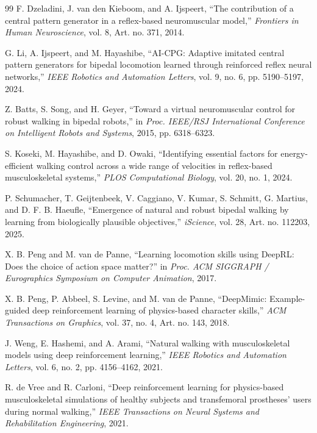 \documentclass[acmtog,screen]{acmart}
\begin{document}
\begin{thebibliography}{99}
F. Dzeladini, J. van den Kieboom, and A. Ijspeert, ``The contribution of a
central pattern generator in a reflex-based neuromuscular model,''
\textit{Frontiers in Human Neuroscience}, vol. 8, Art. no. 371, 2014.

G. Li, A. Ijspeert, and M. Hayashibe, ``AI-CPG: Adaptive imitated central
pattern generators for bipedal locomotion learned through reinforced reflex
neural networks,'' \textit{IEEE Robotics and Automation Letters}, vol. 9,
no. 6, pp. 5190--5197, 2024.

Z. Batts, S. Song, and H. Geyer, ``Toward a virtual neuromuscular control for
robust walking in bipedal robots,'' in \textit{Proc. IEEE/RSJ International
Conference on Intelligent Robots and Systems}, 2015, pp. 6318--6323.

S. Koseki, M. Hayashibe, and D. Owaki, ``Identifying essential factors for
energy-efficient walking control across a wide range of velocities in
reflex-based musculoskeletal systems,'' \textit{PLOS Computational Biology},
vol. 20, no. 1, 2024.

P. Schumacher, T. Geijtenbeek, V. Caggiano, V. Kumar, S. Schmitt, G. Martius,
and D. F. B. Haeufle, ``Emergence of natural and robust bipedal walking by
learning from biologically plausible objectives,'' \textit{iScience}, vol. 28,
Art. no. 112203, 2025.

X. B. Peng and M. van de Panne, ``Learning locomotion skills using DeepRL:
Does the choice of action space matter?'' in \textit{Proc. ACM SIGGRAPH /
Eurographics Symposium on Computer Animation}, 2017.

X. B. Peng, P. Abbeel, S. Levine, and M. van de Panne, ``DeepMimic:
Example-guided deep reinforcement learning of physics-based character skills,''
\textit{ACM Transactions on Graphics}, vol. 37, no. 4, Art. no. 143, 2018.

J. Weng, E. Hashemi, and A. Arami, ``Natural walking with musculoskeletal
models using deep reinforcement learning,'' \textit{IEEE Robotics and
Automation Letters}, vol. 6, no. 2, pp. 4156--4162, 2021.

R. de Vree and R. Carloni, ``Deep reinforcement learning for physics-based
musculoskeletal simulations of healthy subjects and transfemoral prostheses'
users during normal walking,'' \textit{IEEE Transactions on Neural Systems and
Rehabilitation Engineering}, 2021.


\end{thebibliography}
\end{document}

